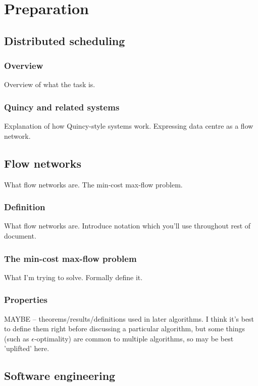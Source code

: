 \chapter{Preparation} \label{chap:prep}

\section{Distributed scheduling} \label{sec:prep-scheduling}
\subsection{Overview} \label{prep-scheduling-overview}
Overview of what the task is.

\subsection{Quincy and related systems} \label{prep-scheduling-quincy}
Explanation of how Quincy-style systems work. Expressing data centre as a flow network.

\section{Flow networks} \label{prep-flow}
What flow networks are. The min-cost max-flow problem.

\subsection{Definition} \label{prep-flow-definition}
What flow networks are. Introduce notation which you'll use throughout rest of document.

\subsection{The min-cost max-flow problem} \label{prep-flow-problem}
What I'm trying to solve. Formally define it.

\subsection{Properties}
\label{prep-flow-results}
MAYBE -- theorems/results/definitions used in later algorithms. I think it's best to define them right before discussing a particular algorithm, but some things (such as $\epsilon$-optimality) are common to multiple algorithms, so may be best 'uplifted' here.

\section{Software engineering} \label{sec:prep-sweng}

